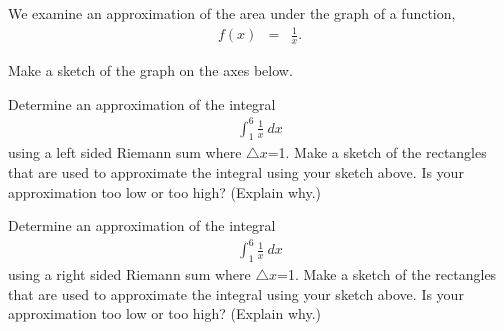 \begin{problem}
\item We examine an approximation of the area under the graph of a function,
\begin{eqnarray*}
  f(x) & = & \frac{1}{x}.
\end{eqnarray*}
  \begin{subproblem}
    \item Make a sketch of the graph on the axes below. \\

\item Determine an approximation of the integral
  \begin{eqnarray*}
    \int_1^6 \frac{1}{x} ~ dx
  \end{eqnarray*}
  using a left sided Riemann sum where $\triangle x$=1.
  Make a sketch of the rectangles that are used to approximate the integral using your sketch above.
  Is your approximation too low or too high? (Explain why.)

  \vfill

  \item Determine an approximation of the integral
    \begin{eqnarray*}
      \int_1^6 \frac{1}{x} ~ dx
    \end{eqnarray*}
    using a right sided Riemann sum where $\triangle x$=1.
    Make a sketch of the rectangles that are used to approximate the integral using your sketch above.
    Is your approximation too low or too high? (Explain why.)

    \vfill

  \end{subproblem}
\end{problem}



